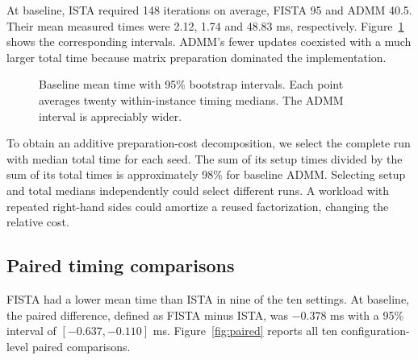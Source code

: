 \documentclass{article}
\begin{document}
At baseline, ISTA required 148 iterations on average, FISTA 95 and ADMM 40.5. Their mean measured times were 2.12, 1.74 and 48.83 ms, respectively. Figure~\ref{fig:timing} shows the corresponding intervals. ADMM's fewer updates coexisted with a much larger total time because matrix preparation dominated the implementation.
\begin{figure}[htbp]\centering
{}
\caption{Baseline mean time with 95\% bootstrap intervals. Each point averages twenty within-instance timing medians. The ADMM interval is appreciably wider.}\label{fig:timing}
\end{figure}

To obtain an additive preparation-cost decomposition, we select the complete run with median total time for each seed. The sum of its setup times divided by the sum of its total times is approximately 98\% for baseline ADMM. Selecting setup and total medians independently could select different runs. A workload with repeated right-hand sides could amortize a reused factorization, changing the relative cost.

\subsection{Paired timing comparisons}
FISTA had a lower mean time than ISTA in nine of the ten settings. At baseline, the paired difference, defined as FISTA minus ISTA, was $-0.378$ ms with a 95\% interval of $[-0.637,-0.110]$ ms. Figure~\ref{fig:paired} reports all ten configuration-level paired comparisons.
\end{document}
